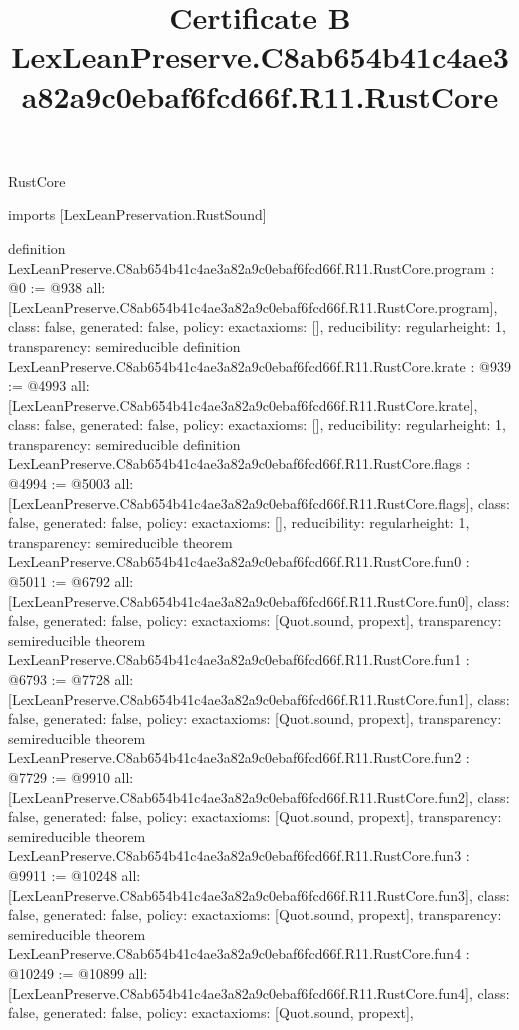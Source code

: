 \begin{lexlean}{RustCore}
\title{Certificate B LexLeanPreserve.C8ab654b41c4ae3a82a9c0ebaf6fcd66f.R11.RustCore}
\begin{coremodule}
imports [LexLeanPreservation.RustSound]

definition LexLeanPreserve.C8ab654b41c4ae3a82a9c0ebaf6fcd66f.R11.RustCore.program : @0 := @938 {
  all: [LexLeanPreserve.C8ab654b41c4ae3a82a9c0ebaf6fcd66f.R11.RustCore.program],
  class: false,
  generated: false,
  policy: exact{axioms: []},
  reducibility: regular{height: 1},
  transparency: semireducible
}
definition LexLeanPreserve.C8ab654b41c4ae3a82a9c0ebaf6fcd66f.R11.RustCore.krate : @939 := @4993 {
  all: [LexLeanPreserve.C8ab654b41c4ae3a82a9c0ebaf6fcd66f.R11.RustCore.krate],
  class: false,
  generated: false,
  policy: exact{axioms: []},
  reducibility: regular{height: 1},
  transparency: semireducible
}
definition LexLeanPreserve.C8ab654b41c4ae3a82a9c0ebaf6fcd66f.R11.RustCore.flags : @4994 := @5003 {
  all: [LexLeanPreserve.C8ab654b41c4ae3a82a9c0ebaf6fcd66f.R11.RustCore.flags],
  class: false,
  generated: false,
  policy: exact{axioms: []},
  reducibility: regular{height: 1},
  transparency: semireducible
}
theorem LexLeanPreserve.C8ab654b41c4ae3a82a9c0ebaf6fcd66f.R11.RustCore.fun0 : @5011 := @6792 {
  all: [LexLeanPreserve.C8ab654b41c4ae3a82a9c0ebaf6fcd66f.R11.RustCore.fun0],
  class: false,
  generated: false,
  policy: exact{axioms: [Quot.sound, propext]},
  transparency: semireducible
}
theorem LexLeanPreserve.C8ab654b41c4ae3a82a9c0ebaf6fcd66f.R11.RustCore.fun1 : @6793 := @7728 {
  all: [LexLeanPreserve.C8ab654b41c4ae3a82a9c0ebaf6fcd66f.R11.RustCore.fun1],
  class: false,
  generated: false,
  policy: exact{axioms: [Quot.sound, propext]},
  transparency: semireducible
}
theorem LexLeanPreserve.C8ab654b41c4ae3a82a9c0ebaf6fcd66f.R11.RustCore.fun2 : @7729 := @9910 {
  all: [LexLeanPreserve.C8ab654b41c4ae3a82a9c0ebaf6fcd66f.R11.RustCore.fun2],
  class: false,
  generated: false,
  policy: exact{axioms: [Quot.sound, propext]},
  transparency: semireducible
}
theorem LexLeanPreserve.C8ab654b41c4ae3a82a9c0ebaf6fcd66f.R11.RustCore.fun3 : @9911 := @10248 {
  all: [LexLeanPreserve.C8ab654b41c4ae3a82a9c0ebaf6fcd66f.R11.RustCore.fun3],
  class: false,
  generated: false,
  policy: exact{axioms: [Quot.sound, propext]},
  transparency: semireducible
}
theorem LexLeanPreserve.C8ab654b41c4ae3a82a9c0ebaf6fcd66f.R11.RustCore.fun4 : @10249 := @10899 {
  all: [LexLeanPreserve.C8ab654b41c4ae3a82a9c0ebaf6fcd66f.R11.RustCore.fun4],
  class: false,
  generated: false,
  policy: exact{axioms: [Quot.sound, propext]},
}
\end{coremodule}
\end{lexlean}
